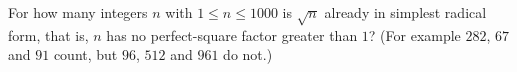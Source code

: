For how many integers $n$ with $1\le n\le1000$ is $\sqrt n$ already in simplest radical form, that is, $n$ has no perfect-square factor greater than $1$? (For example $282$, $67$ and $91$ count, but $96$, $512$ and $961$ do not.)
